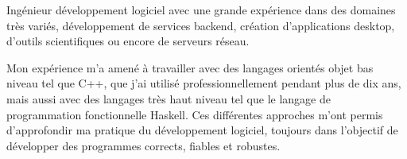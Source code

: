 
\begin{cvparagraph}

    Ingénieur développement logiciel avec une grande expérience dans des
    domaines très variés, développement de services backend, création
    d'applications desktop, d'outils scientifiques ou encore de serveurs
    réseau.

    Mon expérience m'a amené à travailler avec des langages orientés objet bas
    niveau tel que C++, que j'ai utilisé professionnellement pendant plus de
    dix ans, mais aussi avec des langages très haut niveau tel que le langage
    de programmation fonctionnelle Haskell. Ces différentes approches m'ont
    permis d'approfondir ma pratique du développement logiciel, toujours dans
    l'objectif de développer des programmes corrects, fiables et robustes.

\end{cvparagraph}

